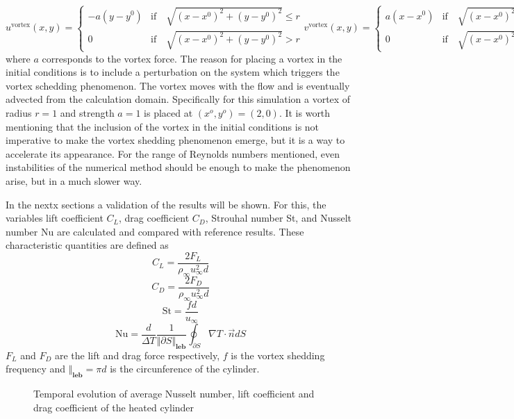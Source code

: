 {
\begin{subequations}
\begin{equation}
	u^{\text{vortex}}(x,y) = 
	\begin{cases}
		-a(y-y^0) & \text{if} \quad\sqrt{(x-x^0)^2+(y-y^0)^2} \leq r \\
		0 & \text{if} \quad\sqrt{(x-x^0)^2+(y-y^0)^2} > r
	\end{cases}
\end{equation}\label{eq:VortexU}
\begin{equation}
	v^{\text{vortex}}(x,y) = 
	\begin{cases}
		a(x-x^0) & \text{if} \quad\sqrt{(x-x^0)^2+(y-y^0)^2} \leq r \\
		0 & \text{if} \quad\sqrt{(x-x^0)^2+(y-y^0)^2} > r
	\end{cases}
\end{equation}	\label{eq:VortexV}
\end{subequations}
}%
where $a$ corresponds to the vortex force. The reason for placing a vortex in the initial conditions is to include a perturbation on the system which triggers the vortex schedding phenomenon.  The vortex moves with the flow and is eventually advected from the calculation domain. Specifically for this simulation a vortex of radius $r=1$ and strength $a = 1$ is placed at $(x^o,y^o) = ( 2,0)$. It is  worth mentioning that the inclusion of the vortex in the initial conditions is not imperative to make the vortex shedding phenomenon emerge, but it is a way to accelerate its appearance. For the range of Reynolds numbers mentioned, even instabilities of the numerical method should be enough to make the phenomenon arise, but in a much slower way. 

In the nextx sections a validation of the results will be shown. For this, the variables lift coefficient $C_L$, drag coefficient $C_D$, Strouhal number St, and Nusselt number Nu are calculated and compared with reference results. These characteristic quantities are defined as
\begin{equation} 
	C_L = \frac{2F_L}{\rho_\infty u^2_\infty d}
\end{equation}
\begin{equation}
	C_D = \frac{2F_D}{\rho_\infty u^2_\infty d}
\end{equation}
\begin{equation}
	\text{St} = \frac{fd}{u_\infty}
\end{equation}
\begin{equation}
	\text{Nu} = \frac{d}{\Delta T}\frac{1}{\Vert \partial S\Vert_{\textbf{leb}}}\oint_{\partial S} \nabla T \cdot \vec{n} dS
\end{equation}
$F_L$ and $F_D$ are the lift and drag force respectively, $f$ is the vortex shedding frequency and $\Vert_{\textbf{leb}} = \pi d$ is the circunference of the cylinder.
\begin{figure}[t]
	\centering	
	\caption{Temporal evolution of average Nusselt number, lift coefficient and drag coefficient of the heated cylinder}	\label{fig:HeatedCylinderResults}
\end{figure}
